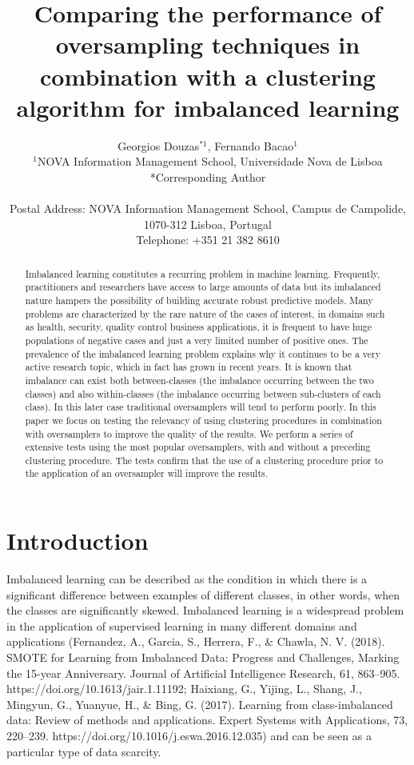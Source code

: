 \documentclass[parskip=full]{scrartcl}
\title{Comparing the performance of oversampling techniques in combination with a clustering algorithm for imbalanced learning}
\author{
	Georgios Douzas\(^{*1}\), Fernando Bacao\(^{1}\)
	\\
	\small{\(^{1}\)NOVA Information Management School, Universidade Nova de Lisboa}
	\\
	\small{*Corresponding Author}
	\\
	\\
	\small{Postal Address: NOVA Information Management School, Campus de Campolide, 1070-312 Lisboa, Portugal}
	\\
	\small{Telephone: +351 21 382 8610}
}
\date{}
\begin{document}
\maketitle

\begin{abstract}
Imbalanced learning constitutes a recurring problem in machine learning. Frequently, practitioners and researchers have access to large amounts of data but its imbalanced nature hampers the possibility of building accurate robust predictive models. Many problems are characterized by the rare nature of the cases of interest, in domains such as health, security, quality control business applications, it is frequent to have huge populations of negative cases and just a very limited number of positive ones. The prevalence of the imbalanced learning problem explains why it continues to be a very active research topic, which in fact has grown in recent years. It is known that imbalance can exist both between-classes (the imbalance occurring between the two classes) and also within-classes (the imbalance occurring between sub-clusters of each class). In this later case traditional oversamplers will tend to perform poorly. In this paper we focus on testing the relevancy of using clustering procedures in combination with oversamplers to improve the quality of the results. We perform a series of extensive tests using the most popular oversamplers, with and without a preceding clustering procedure. The tests confirm that the use of a clustering procedure prior to the application of an oversampler will improve the results.
\end{abstract}

\section{Introduction}

Imbalanced learning can be described as the condition in which there is a significant difference between examples of different classes, in other words, when the classes are significantly skewed. Imbalanced learning is a widespread problem in the application of supervised learning in many different domains and applications (Fernandez, A., Garcia, S., Herrera, F., & Chawla, N. V. (2018). SMOTE for Learning from Imbalanced Data: Progress and Challenges, Marking the 15-year Anniversary. Journal of Artificial Intelligence Research, 61, 863–905. https://doi.org/10.1613/jair.1.11192; Haixiang, G., Yijing, L., Shang, J., Mingyun, G., Yuanyue, H., & Bing, G. (2017). Learning from class-imbalanced data: Review of methods and applications. Expert Systems with Applications, 73, 220–239. https://doi.org/10.1016/j.eswa.2016.12.035) and can be seen as a particular type of data scarcity.
\end{document}
